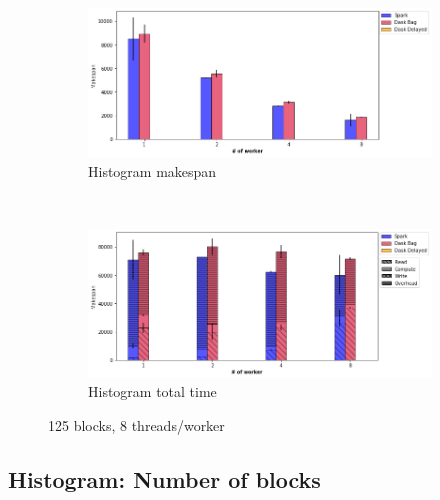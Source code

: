 \documentclass[conference]{IEEEtran}
\begin{document}
\begin{figure}[!t]
    \centering
    \begin{subfigure}[b]{\columnwidth}
        \includegraphics[clip,width=\columnwidth]{images/histo_worker.png}%
        \caption{Histogram makespan}\label{fig:histo_ms_worker}
    \end{subfigure}
    \\
    \begin{subfigure}[b]{\columnwidth}
        \includegraphics[clip,width=\columnwidth]{images/histo_idle_worker.png}%
        \caption{Histogram total time}\label{fig:histo_tt_worker}
    \end{subfigure}
    \caption{125 blocks, 8 threads/worker}
\end{figure}

\subsection{Histogram: Number of blocks}
\end{document}
